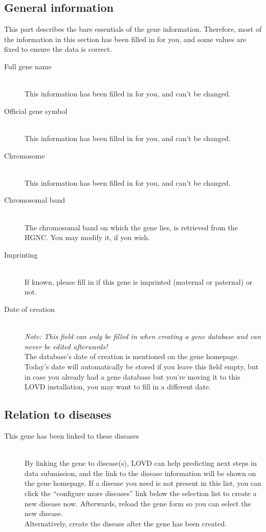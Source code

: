 \documentclass[a4paper,oneside,openany,12pt]{memoir}
\begin{document}
\subsection{General information}
This part describes the bare essentials of the gene information.
Therefore, most of the information in this section has been filled in for you, and some values are fixed to ensure the data is correct.
\begin{description}
  \item[Full gene name] \hfill \\
  This information has been filled in for you, and can't be changed.
  \item[Official gene symbol] \hfill \\
  This information has been filled in for you, and can't be changed.
  \item[Chromosome] \hfill \\
  This information has been filled in for you, and can't be changed.
  \item[Chromosomal band] \hfill \\
  The chromosomal band on which the gene lies, is retrieved from the HGNC. You may modify it, if you wish.
  \item[Imprinting] \hfill \\
  If known, please fill in if this gene is imprinted (maternal or paternal) or not.
  \item[Date of creation] \hfill \\
  \emph{Note: This field can only be filled in when creating a gene database and can never be edited afterwards!}
  \\
  The database's date of creation is mentioned on the gene homepage.
  Today's date will automatically be stored if you leave this field empty, but in case you already had a gene database but you're moving it to this LOVD installation, you may want to fill in a different date.
\end{description}



\subsection{Relation to diseases}
\begin{description}
  \item[This gene has been linked to these diseases] \hfill \\
  By linking the gene to disease(s), LOVD can help predicting next steps in data submission, and the link to the disease information will be shown on the gene homepage.
  If a disease you need is not present in this list, you can click the ``configure more diseases'' link below the selection list to create a new disease now.
  Afterwards, reload the gene form so you can select the new disease.
  \\
  Alternatively, create the disease after the gene has been created.
\end{description}
\end{document}
